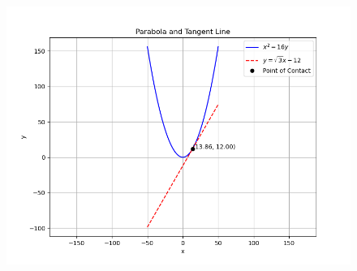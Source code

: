 \documentclass[journal]{IEEEtran}
\begin{document}
\begin{figure}[h!]
    \centering
    \includegraphics[height=0.5\textheight, keepaspectratio]{figs/Figure_1.png}
    \label{figure_1}
\end{figure}
\end{document}
